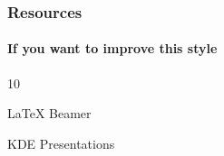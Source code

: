 \documentclass{article}
\begin{document}
\begin{frame}
  \frametitle{Resources}
  \framesubtitle{If you want to improve this style}
  \begin{thebibliography}{10}

  \beamertemplatearticlebibitems

    LaTeX Beamer

    KDE Presentations

  \end{thebibliography}
\end{frame}

\frame{
  \vspace{2cm}
  {\huge Questions ?}

}
\end{document}
